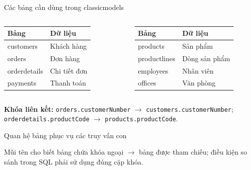 \documentclass[aspectratio=169,10pt]{beamer}
\newcommand{\code}[1]{\texttt{#1}}
\begin{document}
\begin{frame}[fragile]{Các bảng cần dùng trong classicmodels}
\begin{columns}[T,onlytextwidth]
\small
\begin{tabularx}{\linewidth}{>{\ttfamily}l X}\toprule
Bảng & Dữ liệu\\\midrule
customers & Khách hàng\\
orders & Đơn hàng\\
orderdetails & Chi tiết đơn\\
payments & Thanh toán\\\bottomrule
\end{tabularx}
\small
\begin{tabularx}{\linewidth}{>{\ttfamily}l X}\toprule
Bảng & Dữ liệu\\\midrule
products & Sản phẩm\\
productlines & Dòng sản phẩm\\
employees & Nhân viên\\
offices & Văn phòng\\\bottomrule
\end{tabularx}
\end{columns}
\vspace{.5em}
\small \textbf{Khóa liên kết:} \code{orders.customerNumber} $\rightarrow$ \code{customers.customerNumber}; \code{orderdetails.productCode} $\rightarrow$ \code{products.productCode}.
\end{frame}

\begin{frame}[fragile]{Quan hệ bảng phục vụ các truy vấn con}
\begin{center}
\end{center}
\vspace{.1em}
\small Mũi tên cho biết bảng chứa khóa ngoại $\rightarrow$ bảng được tham chiếu; điều kiện so sánh trong SQL phải sử dụng đúng cặp khóa.
\end{frame}
\end{document}
